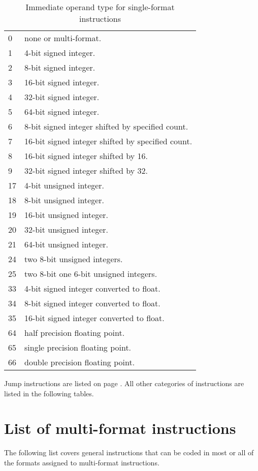 \documentclass[forwardcom.tex]{subfiles}
\begin{document}
\begin{longtable} {|p{18mm}|p{100mm}|}
\caption{
Immediate operand type for single-format instructions} 
\label{table:immediateOperantTypesInInstructionList}
\\
\endfirsthead
\endhead
\hline
0 & none or multi-format. \\
1 & 4-bit signed integer. \\
2 & 8-bit signed integer. \\
3 & 16-bit signed integer. \\
4 & 32-bit signed integer. \\
5 & 64-bit signed integer. \\
6 & 8-bit signed integer shifted by specified count. \\
7 & 16-bit signed integer shifted by specified count. \\
8 & 16-bit signed integer shifted by 16. \\
9 & 32-bit signed integer shifted by 32. \\
17 & 4-bit unsigned integer. \\
18 & 8-bit unsigned integer. \\
19 & 16-bit unsigned integer. \\
20 & 32-bit unsigned integer. \\
21 & 64-bit unsigned integer. \\
24 & two 8-bit unsigned integers. \\
25 & two 8-bit one 6-bit unsigned integers. \\
33 & 4-bit signed integer converted to float. \\
34 & 8-bit signed integer converted to float. \\
35 & 16-bit signed integer converted to float. \\
64 & half precision floating point. \\
65 & single precision floating point. \\
66 & double precision floating point. \\
\hline
\end{longtable}

Jump instructions are listed on page \pageref{table:controlTransferInstructions}. All other categories of instructions are listed in the following tables.

\section{List of multi-format instructions}
The following list covers general instructions that can be coded in most or all of the formats
assigned to multi-format instructions.
\end{document}
